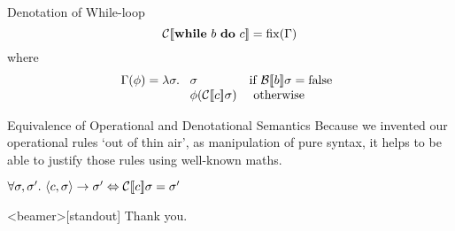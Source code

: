 \begin{frame}{Denotation of While-loop}
    \[\mathcal{C} [\![ \mathbf{while}\ b\ \mathbf{do}\ c ]\!] = \mathrm{fix}(\Gamma) \]
    where
    \[\Gamma(\phi) = \lambda \sigma.\ \begin{array}[t]{ll}
            \sigma & \text{if } \denB{b}\sigma = \mathrm{false} \\
            \phi(\denC{c}\sigma) & \textrm{ otherwise }
    \end{array}\]
\end{frame}

\begin{frame}{Equivalence of Operational and Denotational Semantics}
    Because we invented our operational rules `out of thin air', as
    manipulation of pure syntax, it helps to be able to justify those
    rules using well-known maths.
    \begin{theorem}
        $\forall \sigma, \sigma'.\ \langle c, \sigma \rangle \rightarrow \sigma' \Leftrightarrow \mathcal{C} [\![ c ]\!]{\sigma} = \sigma'$
    \end{theorem}
\end{frame}

\begin{frame}<beamer>[standout]
  Thank you.
\end{frame}






